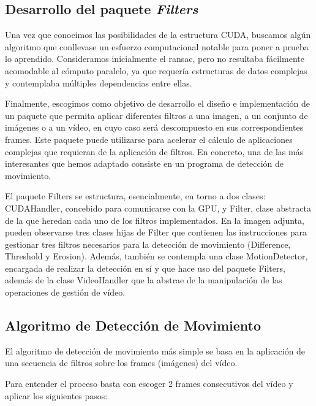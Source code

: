 \documentclass[twoside]{article}
\begin{document}
\subsection{Desarrollo del paquete \emph{Filters}}

Una vez que conocimos las posibilidades de la estructura CUDA, buscamos algún algoritmo que conllevase un esfuerzo computacional notable para poner a prueba lo aprendido. Consideramos inicialmente el ransac, pero no resultaba fácilmente acomodable al cómputo paralelo, ya que requería estructuras de datos complejas y contemplaba múltiples dependencias entre ellas.

\vspace{5 mm}

Finalmente, escogimos como objetivo de desarrollo el diseño e implementación de un paquete que permita aplicar diferentes filtros a una imagen, a un conjunto de imágenes o a un vídeo, en cuyo caso será descompuesto en sus correspondientes frames. Este paquete puede utilizarse para acelerar el cálculo de aplicaciones complejas que requieran de la aplicación de filtros. En concreto, una de las más interesantes que hemos adaptado consiste en un programa de detección de movimiento.

\vspace{5 mm}

El paquete Filters se estructura, esencialmente, en torno a dos clases: CUDAHandler, concebido para comunicarse con la GPU, y Filter, clase abstracta de la que heredan cada uno de los filtros implementados. En la imagen adjunta, pueden observarse tres clases hijas de Filter que contienen las instrucciones para gestionar tres filtros necesarios para la detección de movimiento (Difference, Threshold y Erosion). Además, también se contempla una clase MotionDetector, encargada de realizar la detección en sí y que hace uso del paquete Filters, además de la clase VideoHandler que la abstrae de la manipulación de las operaciones de gestión de vídeo.

\subsection{Algoritmo de Detección de Movimiento}

El algoritmo de detección de movimiento más simple se basa en la aplicación de una secuencia de filtros sobre los frames (imágenes) del vídeo.

Para entender el proceso basta con escoger 2 frames consecutivos del vídeo y aplicar los siguientes pasos:
\end{document}
